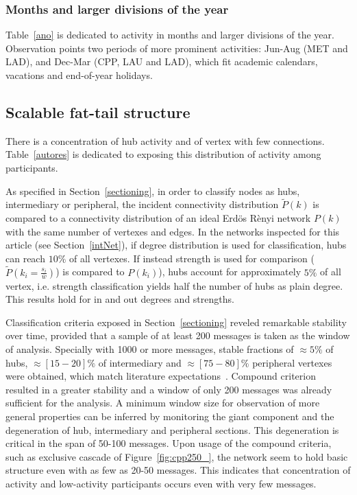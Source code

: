 \documentclass[%
 aip,
 jmp,%
 amsmath,amssymb,
 reprint,%
]{revtex4-1}
\begin{document}
        \subsubsection{Months and larger divisions of the year}
Table~\ref{ano} is dedicated to activity in months and larger divisions of the year.
Observation points two periods of more prominent activities: Jun-Aug (MET and LAD), and Dec-Mar (CPP, LAU and LAD), which fit academic calendars, vacations and end-of-year holidays.

    \subsection{Scalable fat-tail structure}\label{subsec:pih}

There is a concentration of hub activity and of vertex with few connections. Table~\ref{autores} is dedicated to exposing this distribution of activity among participants.

As specified in Section~\ref{sectioning}, in order to classify nodes as hubs, intermediary or peripheral, the incident connectivity distribution $\widetilde{P}(k)$ is compared
to a connectivity distribution of an ideal Erd\"os R\`enyi network $P(k)$ with the same number of vertexes and edges. In the networks inspected for this article (see Section~\ref{intNet}), if degree distribution is used for classification, hubs can reach $10\%$ of all vertexes. 
 If instead strength is used for comparison ($\widetilde{P}(k_i=\frac{s_i}{\overline{w}})$) is compared
to $P(k_i)$), hubs account for approximately $5\%$ of all vertex, i.e. strength classification yields half the number of hubs as plain degree. This results hold for in and out degrees and strengths.

Classification criteria exposed in Section~\ref{sectioning} reveled remarkable stability over time, provided that a sample of at least 200 messages is taken as the window of analysis. Specially with 1000 or more messages, stable fractions of $\approx 5\%$ of hubs, $\approx [15-20]\%$ of intermediary and $\approx [75-80]\%$ peripheral vertexes were obtained, which match literature expectations~\cite{secFree}.
Compound criterion resulted in a greater stability and a window of only 200 messages was already sufficient for the analysis.
A minimum window size for observation of more general properties can be inferred by monitoring the giant component and the degeneration of hub, intermediary and peripheral sections. This degeneration is critical in the span of 50-100 messages. Upon usage of the compound criteria, such as exclusive cascade of Figure~\ref{fig:cpp250_}, the network seem to hold basic structure even with as few as 20-50 messages. This indicates that concentration of activity and low-activity participants occurs even with very few messages.
\end{document}
